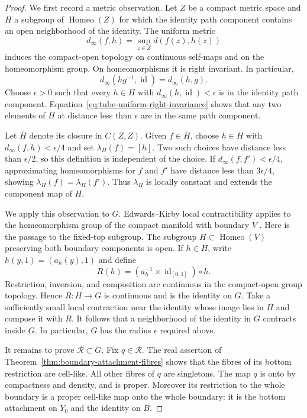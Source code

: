 \begin{proof}
We first record a metric observation.  Let $Z$ be a compact metric
space and $H$ a subgroup of $\operatorname{Homeo}(Z)$ for which
the identity path component contains an open neighborhood of the
identity.  The uniform metric
\[
 d_\infty(f,h)=\sup_{z\in Z}d(f(z),h(z))
\]
induces the compact-open topology on continuous self-maps and
on the homeomorphism group.  On homeomorphisms it is right
invariant.  In particular,
\begin{equation}\label{eq:tube-uniform-right-invariance}
 d_\infty(hg^{-1},\operatorname{id})=d_\infty(h,g).
\end{equation}
Choose $\epsilon>0$ such that every $h\in H$ with
$d_\infty(h,\operatorname{id})<\epsilon$ is in the identity
path component.  Equation~\eqref{eq:tube-uniform-right-invariance}
shows that any two elements of $H$ at distance less than
$\epsilon$ are in the same path component.

Let $\overline H$ denote its closure in $C(Z,Z)$.  Given
$f\in\overline H$, choose $h\in H$ with
$d_\infty(f,h)<\epsilon/4$ and set $\lambda_H(f)=[h]$.
Two such choices have distance less than $\epsilon/2$, so this
definition is independent of the choice.  If
$d_\infty(f,f')<\epsilon/4$, approximating homeomorphisms for
$f$ and $f'$ have distance less than $3\epsilon/4$, showing
$\lambda_H(f)=\lambda_H(f')$.  Thus $\lambda_H$ is locally
constant and extends the component map of $H$.

We apply this observation to $G$.  Edwards--Kirby local
contractibility applies to the homeomorphism group of the compact
manifold with boundary $V$
\cite[Corollary~1.1, p.~63; proof, p.~77]{EdwardsKirby1971}.
Here is the passage to the fixed-top subgroup.  The subgroup
$H\subset\operatorname{Homeo}(V)$ preserving both boundary
components is open.  If $h\in H$, write
$h(y,1)=(a_h(y),1)$ and define
\[
 R(h)=(a_h^{-1}\times\operatorname{id}_{[0,1]})\circ h.
\]
Restriction, inversion, and composition are continuous in the
compact-open group topology.  Hence $R:H\to G$ is continuous
and is the identity on $G$.  Take a sufficiently small local
contraction near the identity whose image lies in $H$ and
compose it with $R$.  It follows that a neighborhood of the
identity in $G$ contracts inside $G$.  In particular, $G$ has
the radius $\epsilon$ required above.

It remains to prove $\mathcal R\subset\overline G$.  Fix
$q\in\mathcal R$.  The real assertion of
Theorem~\ref{thm:boundary-attachment-fibres} shows that the
fibres of its bottom restriction are cell-like.  All other
fibres of $q$ are singletons.  The map $q$ is onto by compactness
and density, and is proper.  Moreover its restriction to the
whole boundary is a proper cell-like map onto the whole
boundary: it is the bottom attachment on $Y_0$ and the identity
on $B$.


\end{proof}
